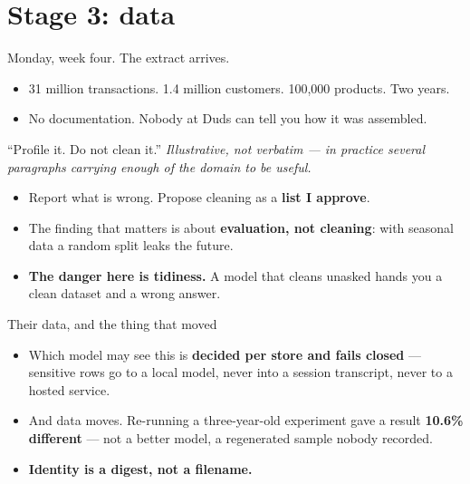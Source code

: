 \documentclass[aspectratio=169,t]{beamer}
\begin{document}
\section{Stage 3: data}

\begin{frame}{Monday, week four. The extract arrives.}
    \begin{itemize}
        \item 31 million transactions. 1.4 million customers. 100{,}000 products.
              Two years.
        \item No documentation. Nobody at Duds can tell you how it was assembled.
    \end{itemize}
\end{frame}

\begin{frame}{``Profile it. Do not clean it.''}
    \emph{Illustrative, not verbatim --- in practice several paragraphs carrying
    enough of the domain to be useful.}
    \begin{itemize}
        \item Report what is wrong. Propose cleaning as a \textbf{list I approve}.
        \item The finding that matters is about \textbf{evaluation, not cleaning}:
              with seasonal data a random split leaks the future.
        \item \textbf{The danger here is tidiness.} A model that cleans unasked
              hands you a clean dataset and a wrong answer.
    \end{itemize}
\end{frame}

\begin{frame}{Their data, and the thing that moved}
    \begin{itemize}
        \item Which model may see this is \textbf{decided per store and fails
              closed} --- sensitive rows go to a local model, never into a session
              transcript, never to a hosted service.
        \item And data moves. Re-running a three-year-old experiment gave a result
              \textbf{10.6\% different} --- not a better model, a regenerated
              sample nobody recorded.
        \item \textbf{Identity is a digest, not a filename.}
    \end{itemize}
\end{frame}
\end{document}
